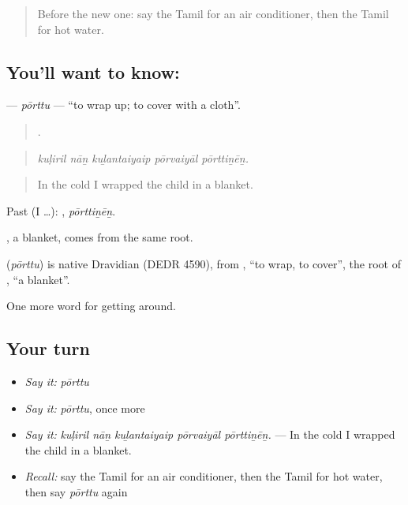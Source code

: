 \label{lesson:TA-C419-porttu}



\begin{quote}
Before the new one: say the Tamil for an air conditioner, then the Tamil for hot water.
\end{quote}

\subsection*{You'll want to know: }
\textbf{} — \emph{pōrttu} — \textquotedblleft{}to wrap up; to cover with a cloth\textquotedblright{}.

\begin{quote}
    .
\end{quote}

\begin{quote}
\emph{kuḷiril nāṉ kuḻantaiyaip pōrvaiyāl pōrttiṉēṉ.}
\end{quote}

\begin{quote}
In the cold I wrapped the child in a blanket.
\end{quote}

Past (I …): , \emph{pōrttiṉēṉ}.

, a blanket, comes from the same root.

\begin{cousinweb}
\textbf{} (\emph{pōrttu}) is native Dravidian (DEDR 4590), from , \textquotedblleft{}to wrap, to cover\textquotedblright{}, the root of , \textquotedblleft{}a blanket\textquotedblright{}.
\end{cousinweb}

\begin{grammarlens}[title={What you've built}]
One more word for getting around.
\end{grammarlens}

\subsection*{Your turn}
\begin{itemize}
\raggedright
  \item \emph{Say it:} \emph{pōrttu}
  \item \emph{Say it:} \emph{pōrttu}, once more
  \item \emph{Say it:} \emph{kuḷiril nāṉ kuḻantaiyaip pōrvaiyāl pōrttiṉēṉ.} — In the cold I wrapped the child in a blanket.
  \item \emph{Recall:} say the Tamil for an air conditioner, then the Tamil for hot water, then say \emph{pōrttu} again
\end{itemize}

